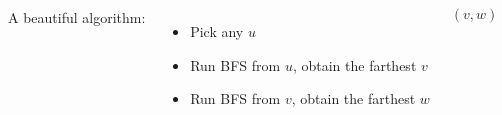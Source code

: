 \begin{frame}{}
  \centerline{}

  \pause
  \vspace{0.80cm}
  \begin{columns}
      {\large A beautiful algorithm:}
      \begin{itemize}
	\item Pick any $u$
	\item Run BFS from $u$, obtain the farthest $v$
	\item Run BFS from $v$, obtain the farthest $w$
      \end{itemize}
      \[
	(v, w)
      \]
    \pause
      \centerline{}
  \end{columns}

  \pause
  \vspace{0.50cm}
  \centerline{}
\end{frame}

